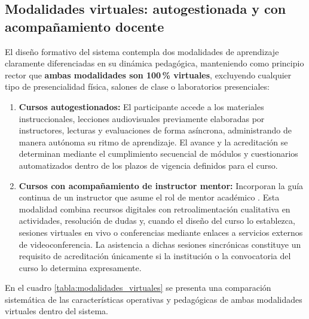 \subsection{Modalidades virtuales: autogestionada y con acompañamiento docente}

El diseño formativo del sistema contempla dos modalidades de aprendizaje claramente diferenciadas en su dinámica pedagógica, manteniendo como principio rector que \textbf{ambas modalidades son 100\,\% virtuales}, excluyendo cualquier tipo de presencialidad física, salones de clase o laboratorios presenciales:

\begin{enumerate}
    \item \textbf{Cursos autogestionados:} El participante accede a los materiales instruccionales, lecciones audiovisuales previamente elaboradas por instructores, lecturas y evaluaciones de forma asíncrona, administrando de manera autónoma su ritmo de aprendizaje. El avance y la acreditación se determinan mediante el cumplimiento secuencial de módulos y cuestionarios automatizados dentro de los plazos de vigencia definidos para el curso.
    \item \textbf{Cursos con acompañamiento de instructor mentor:} Incorporan la guía continua de un instructor que asume el rol de mentor académico \cite{garrison2000critical}. Esta modalidad combina recursos digitales con retroalimentación cualitativa en actividades, resolución de dudas y, cuando el diseño del curso lo establezca, sesiones virtuales en vivo o conferencias mediante enlaces a servicios externos de videoconferencia. La asistencia a dichas sesiones sincrónicas constituye un requisito de acreditación únicamente si la institución o la convocatoria del curso lo determina expresamente.
\end{enumerate}

En el cuadro \ref{tabla:modalidades_virtuales} se presenta una comparación sistemática de las características operativas y pedagógicas de ambas modalidades virtuales dentro del sistema.

